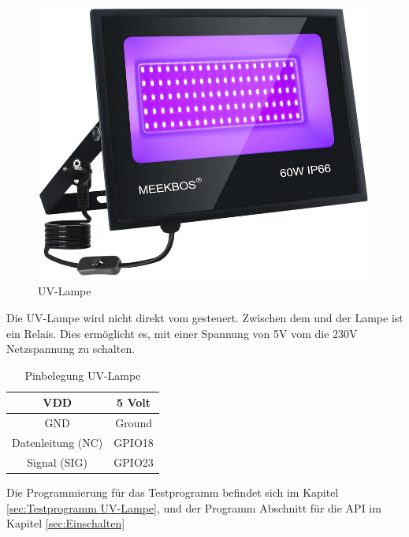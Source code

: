 \begin{figure}[h]
\centering
\includegraphics[scale=0.23]{image/uvlampe.png}
\caption{UV-Lampe\autocite{https://m.media-amazon.com/images/I/617AufdHaoL._AC_SL1500_.jpg}}
\end{figure}
\newpage
Die UV-Lampe wird nicht direkt vom \raspi gesteuert. Zwischen dem \raspi und der Lampe ist ein Relais. Dies ermöglicht es, mit einer Spannung von 5V vom \raspi die 230V Netzspannung zu schalten.\\
\vspace{3mm}
\begin{table}[H]
    \centering
    \begin{tabular}{ | c | c | } 
  \hline
   VDD & 5 Volt\\ 
  \hline
   GND & Ground\\ 
  \hline
   Datenleitung (NC) & GPIO18\\ 
  \hline
   Signal (SIG) & GPIO23\\ 
  \hline
\end{tabular}
    \caption{Pinbelegung UV-Lampe}
\end{table}
\vspace{1mm}
Die Programmierung für das Testprogramm befindet sich im Kapitel \ref{sec:Testprogramm UV-Lampe}, und der Programm Abschnitt für die API im Kapitel \ref{sec:Einschalten}
